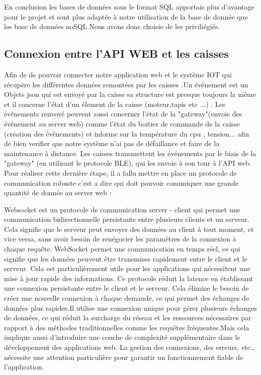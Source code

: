 \documentclass[12pt]{article}
\begin{document}
\justify
\text En conclusion les bases de données sous le format SQL apportais plus d'avantage pour le projet et sont plus adaptée à notre utilisation de la base de donnée que les base de données noSQL.Nous avons donc choisie de les priviliégiés.  

\subsection{Connexion entre l'API WEB et les caisses}

\justify
\text Afin de de pouvoir connecter notre application web et  le système IOT qui récupère les différentes données remontées par les caisses .Un évênement est un Objets json qui est envoyé par la caisse sa structure est presque toujours la même et il concerne l'état d'un élement de la caisse (moteur,tapis etc ...) . Les évênements renvoyé peuvent aussi concerner  l'état de  la "gateway"(envoie des évênement au server web) comme l'état du boitier de commande de la caisse (création des évênements) et informe sur la température du cpu , tension...  afin de bien verifier que notre système n'ai pas de défaillance et faire de la maintenance à distance. Les caisses transmettent les événements par le biais de la "gateway" (en utilisant le protocole BLE), qui les envoie à son tour à l'API web. Pour réaliser cette dernière étape, il a fallu mettre en place un protocole de communication robuste c'est a dire qui doit pouvoir comuniquer une grande quantité de donnée au server web :  

\justify
\text Websocket est un protocole de communication server - client qui permet une communication bidirectionnelle persistante entre plusieurs clients et un serveur. Cela signifie que le serveur peut envoyer des données au client à tout moment, et vice versa, sans avoir besoin de renégocier les paramètres de la connexion à chaque requête. WebSocket permet une communication en temps réel, ce qui signifie que les données peuvent être transmises rapidement entre le client et le serveur. Cela est particulièrement utile pour les applications qui nécessitent une mise à jour rapide des informations. Ce protocole réduit la latence en établissant une connexion persistante entre le client et le serveur. Cela élimine le besoin de créer une nouvelle connexion à chaque demande, ce qui permet des échanges de données plus rapides.Il utilise une connexion unique pour gérer plusieurs échanges de données, ce qui réduit la surcharge du réseau et les ressources nécessaires par rapport à des méthodes traditionnelles comme les requêtes fréquentes.Mais cela implique aussi  d'introduire une couche de complexité supplémentaire dans le développement des applications web. La gestion des connexions, des erreurs, etc., nécessite une attention particulière pour garantir un fonctionnement fiable de l'application.
\end{document}
